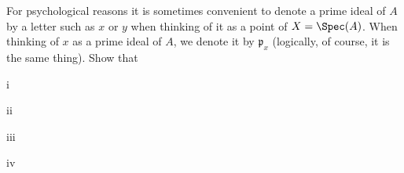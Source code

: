 \begin{exercise}
For psychological reasons it is sometimes convenient to denote a prime ideal of \(A\) by a letter such as \(x\) or \(y\) when thinking of it as a point of \(X = \Spec(A)\).
When thinking of \(x\) as a prime ideal of \(A\), we denote it by \(\mathfrak p_x\) (logically, of course, it is the same thing).
Show that
\end{exercise}

\begin{partsolution}{i}

\end{partsolution}

\begin{partsolution}{ii}

\end{partsolution}

\begin{partsolution}{iii}

\end{partsolution}

\begin{partsolution}{iv}

\end{partsolution}